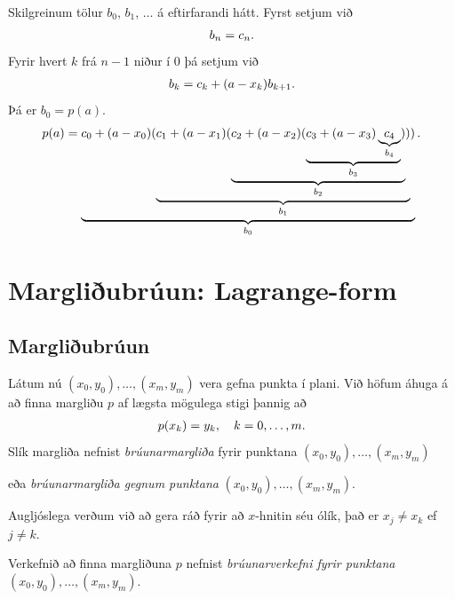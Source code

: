 \documentclass[letterpaper,10pt,icelandic]{sphinxmanual}
\begin{document}
Skilgreinum tölur \(b_0\), \(b_1\), \(\ldots\) á
eftirfarandi hátt. Fyrst setjum við
\begin{gather}
\begin{split}b_n = c_n.\end{split}\notag
\end{gather}
Fyrir hvert \(k\) frá \(n-1\) niður í 0 þá setjum við
\begin{gather}
\begin{split}b_k = c_k + (a - x_k) b_{k+1}.\end{split}\notag
\end{gather}
Þá er \(b_0 = p(a)\).
\begin{gather}
\begin{split}p(a) =
    \underbrace{
      c_0 + (a-x_0)(
      \underbrace{
        c_1 + (a-x_1)(
          \underbrace{c_2 + (a-x_2)(
        \underbrace{c_3 + (a-x_3)
          \underbrace{c_4}_{b_4}
          }_{b_3})
        }_{b_2})
      }_{b_1})
    }_{b_0}.\end{split}\notag
\end{gather}

\section{Margliðubrúun: Lagrange-form}
\label{kafli03:margliubruun-lagrange-form}\label{kafli03:index-6}

\subsection{Margliðubrúun}
\label{kafli03:margliubruun}
Látum nú \((x_0,y_0), \ldots, (x_m,y_m)\) vera gefna punkta í plani.
Við höfum áhuga á að finna margliðu \(p\) af lægsta mögulega stigi
þannig að
\begin{gather}
\begin{split}p(x_k) = y_k, \quad k = 0, \ldots, m.\end{split}\notag
\end{gather}
Slík margliða nefnist \emph{brúunarmargliða} fyrir punktana
\((x_0,y_0), \ldots, (x_m,y_m)\)

eða \emph{brúunarmargliða gegnum punktana}
\((x_0,y_0), \ldots, (x_m,y_m)\).

Augljóslega verðum við að gera ráð fyrir að \(x\)-hnitin séu ólík,
það er \(x_j \not= x_k\) ef \(j \not= k\).

Verkefnið að finna margliðuna \(p\) nefnist \emph{brúunarverkefni fyrir
punktana} \((x_0,y_0), \ldots, (x_m,y_m)\).
\end{document}
